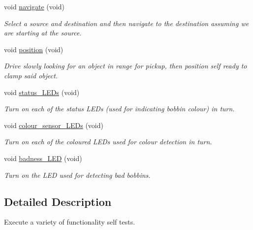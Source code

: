 \begin{DoxyCompactItemize}
void \hyperlink{classIDP_1_1SelfTests_a710347081427c05706f92bdd12f62fbe}{navigate} (void)
\begin{DoxyCompactList}\small\item\em Select a source and destination and then navigate to the destination assuming we are starting at the source. \item\end{DoxyCompactList}\item 
void \hyperlink{classIDP_1_1SelfTests_ada3dfe991573fc6b0922cace927fc4e0}{position} (void)
\begin{DoxyCompactList}\small\item\em Drive slowly looking for an object in range for pickup, then position self ready to clamp said object. \item\end{DoxyCompactList}\item 
void \hyperlink{classIDP_1_1SelfTests_abbe6e3e29b00f760e0b65f2aeb772fb5}{status\_\-LEDs} (void)
\begin{DoxyCompactList}\small\item\em Turn on each of the status LEDs (used for indicating bobbin colour) in turn. \item\end{DoxyCompactList}\item 
void \hyperlink{classIDP_1_1SelfTests_a1380b0222eef47f6d50e7cf334e4c9e7}{colour\_\-sensor\_\-LEDs} (void)
\begin{DoxyCompactList}\small\item\em Turn on each of the coloured LEDs used for colour detection in turn. \item\end{DoxyCompactList}\item 
void \hyperlink{classIDP_1_1SelfTests_aee90c71e9e93398f06dc1ad67002d7bf}{badness\_\-LED} (void)
\begin{DoxyCompactList}\small\item\em Turn on the LED used for detecting bad bobbins. \item\end{DoxyCompactList}\end{DoxyCompactItemize}


\subsection{Detailed Description}
Execute a variety of functionality self tests. 

